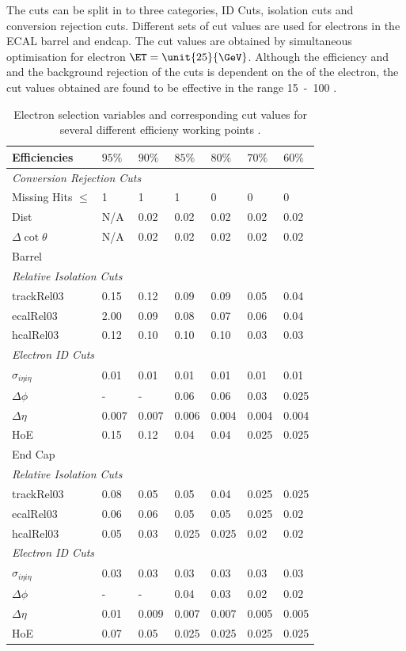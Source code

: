 The cuts can be split in to three categories, ID Cuts, isolation cuts and
conversion rejection cuts. Different sets of cut values are used for electrons in the
ECAL barrel and endcap. The cut values are obtained by simultaneous optimisation
for electron $\ET=\unit{25}{\GeV}$. Although the efficiency and and the background
rejection of the cuts is dependent on the \ET of the electron, the cut values
obtained are found to be effective in the range \unit{15-100}{\GeV}
\cite{nikos,daskalakis2009data}.
\begin{table}[htbp]
  \begin{center}
    \begin{tabular}{lllllll} 
\toprule
Efficiencies& $95\%$& $90\%$& $85\%$& $80\%$& $70\%$& $60\%$\\
\midrule
\multicolumn{7}{l}{\emph{Conversion Rejection Cuts}}\\ 
Missing Hits $\leq$& 1& 1& 1& 0& 0& 0\\
Dist& N/A& 0.02& 0.02& 0.02& 0.02& 0.02\\
$\Delta\cot\theta$& N/A& 0.02& 0.02& 0.02& 0.02& 0.02\\
\midrule
\multicolumn{7}{l}{Barrel}\\ 
\multicolumn{7}{l}{\emph{Relative Isolation Cuts}} \\
trackRel03& 0.15& 0.12& 0.09& 0.09& 0.05& 0.04\\
ecalRel03& 2.00& 0.09& 0.08& 0.07& 0.06& 0.04\\
hcalRel03& 0.12& 0.10& 0.10& 0.10& 0.03& 0.03\\
\multicolumn{7}{l}{\emph{Electron ID Cuts}} \\
$\sigma_{i\eta i\eta}$& 0.01& 0.01& 0.01& 0.01& 0.01& 0.01\\
$\Delta \phi$& - & - & 0.06& 0.06& 0.03& 0.025\\
$\Delta \eta$& 0.007& 0.007& 0.006& 0.004& 0.004& 0.004\\
HoE& 0.15& 0.12& 0.04& 0.04& 0.025& 0.025\\
\midrule
\multicolumn{7}{l}{End Cap}\\ 
\multicolumn{7}{l}{\emph{Relative Isolation Cuts}} \\
trackRel03& 0.08& 0.05& 0.05& 0.04& 0.025& 0.025\\
ecalRel03& 0.06& 0.06& 0.05& 0.05& 0.025& 0.02\\
hcalRel03& 0.05& 0.03& 0.025& 0.025& 0.02& 0.02\\
\multicolumn{7}{l}{\emph{Electron ID Cuts}} \\
$\sigma_{i\eta i\eta}$& 0.03& 0.03& 0.03& 0.03& 0.03& 0.03\\
$\Delta \phi$& - & - & 0.04& 0.03& 0.02& 0.02\\
$\Delta \eta$& 0.01& 0.009& 0.007& 0.007& 0.005& 0.005\\
HoE& 0.07& 0.05& 0.025& 0.025& 0.025& 0.025\\
\bottomrule
    \end{tabular}
    \caption{Electron selection variables and
corresponding cut values for several different efficieny working points
\cite{nikos,daskalakis2009data,simplecutbasedeleid}.}
  \end{center}
\label{tab:electronwp} 
\end{table}

